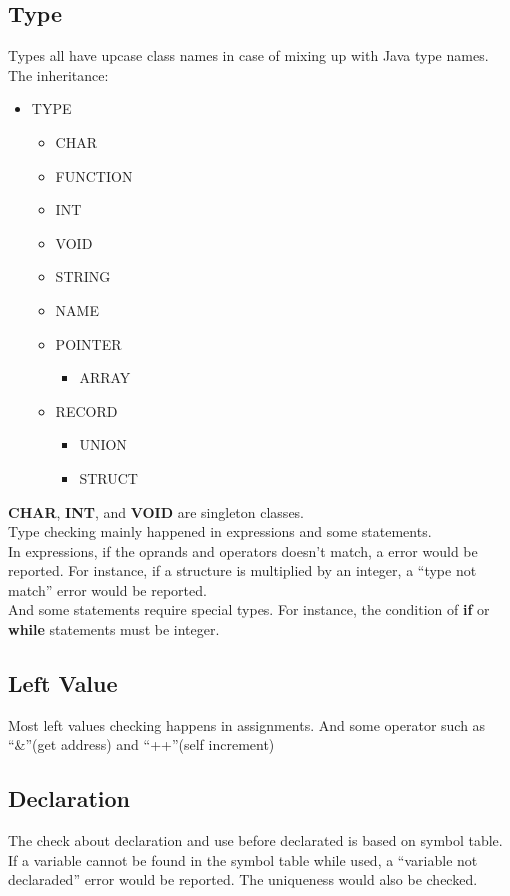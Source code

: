 \documentclass[nocopyrightspace]{sigplanconf}
\begin{document}
\subsection{Type}
	Types all have upcase class names in case of mixing up with Java type names. \\
	The inheritance:
	\begin{itemize}
		\item TYPE
		\begin{itemize}
			\item CHAR
			\item FUNCTION
			\item INT
			\item VOID
			\item STRING
			\item NAME
			\item POINTER
			\begin{itemize}
				\item ARRAY
			\end{itemize}
			\item RECORD
			\begin{itemize}
				\item UNION
				\item STRUCT
			\end{itemize}
		\end{itemize}
	\end{itemize}
	\textbf{CHAR},\textbf{ INT}, and \textbf{VOID} are singleton classes.\\
	Type checking mainly happened in expressions and some statements.\\
	In expressions, if the oprands and operators doesn't match, a error would be reported. For instance, if a structure is multiplied by an integer, a ``type not match'' error would be reported.\\
	And some statements require special types. For instance, the condition of \textbf{if} or \textbf{while} statements must be integer.

\subsection{Left Value}
	Most left values checking happens in assignments. And some operator such as ``\&''(get address) and ``++''(self increment)\\

\subsection{Declaration}
	The check about declaration and use before declarated is based on symbol table. If a variable cannot be found in the symbol table while used, a ``variable not declaraded'' error would be reported. The uniqueness would also be checked.
\end{document}
